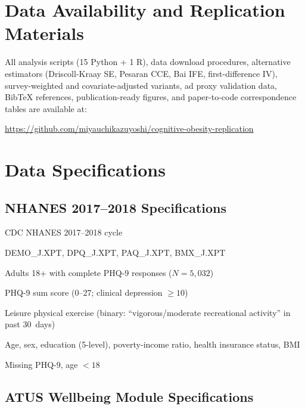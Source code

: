 \documentclass[a4paper,11pt,titlepage]{article}
\begin{document}
\section*{Data Availability and Replication Materials}

All analysis scripts (15 Python + 1 R), data download procedures, alternative estimators (Driscoll-Kraay SE, Pesaran CCE, Bai IFE, first-difference IV), survey-weighted and covariate-adjusted variants, ad proxy validation data, BibTeX references, publication-ready figures, and paper-to-code correspondence tables are available at:

\url{https://github.com/miyauchikazuyoshi/cognitive-obesity-replication}


\appendix
\section{Data Specifications}\label{app:data}

\subsection{NHANES 2017--2018 Specifications}\label{app:nhanes}

\begin{description}[leftmargin=2em]
\item[Data source:] CDC NHANES 2017--2018 cycle
\item[Files used:] DEMO\_J.XPT, DPQ\_J.XPT, PAQ\_J.XPT, BMX\_J.XPT
\item[Sample:] Adults 18+ with complete PHQ-9 responses ($N = 5{,}032$)
\item[Outcome:] PHQ-9 sum score (0--27; clinical depression $\geq 10$)
\item[Key predictor:] Leisure physical exercise (binary: ``vigorous/moderate recreational activity'' in past 30~days)
\item[Covariates:] Age, sex, education (5-level), poverty-income ratio, health insurance status, BMI
\item[Exclusion:] Missing PHQ-9, age $<18$
\end{description}


\subsection{ATUS Wellbeing Module Specifications}\label{app:atus}
\end{document}
